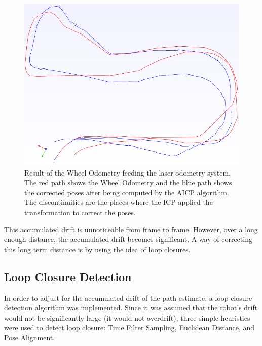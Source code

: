 \documentclass[11pt]{article}
\begin{document}
\begin{figure}
\begin{minipage}{0.65\textwidth}
\centering
\includegraphics[width=\textwidth]{LaserOdometry1}
\end{minipage} \hfill
\begin{minipage}{0.35\textwidth}
\centering
\caption[t]{Result of the Wheel Odometry feeding the laser odometry system. The red path shows the Wheel Odometry and the blue path shows the corrected poses after being computed by the AICP algorithm. The discontinuities are the places where the ICP applied the transformation to correct the poses.}
\label{fig:LaserOdometry1}	
\end{minipage}				
\end{figure}

This accumulated drift is unnoticeable from frame to frame. However, over a long enough distance, the accumulated drift becomes significant. A way of correcting this long term distance is by using the idea of loop closures.
	
	\subsection{Loop Closure Detection}
	\label{subs:LoopCl}

In order to adjust for the accumulated drift of the path estimate, a loop closure detection algorithm was implemented. Since it was assumed that the robot's drift would not be significantly large (it would not overdrift), three simple heuristics were used to detect loop closure: Time Filter Sampling, Euclidean Distance, and Pose Alignment. 
\end{document}
